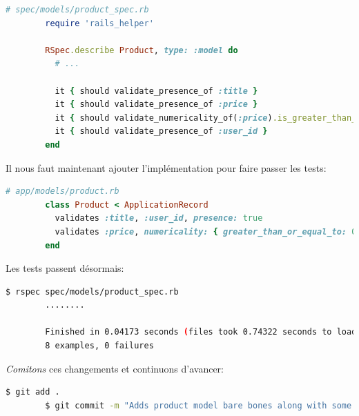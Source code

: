 \documentclass[]{report}
\begin{document}
      \begin{scriptsize}
        \begin{lstlisting}[language=ruby, caption={Ajout de tests de présences pour les produits}, label={lst:add_presence_to_product_test}]
        # spec/models/product_spec.rb
        require 'rails_helper'

        RSpec.describe Product, type: :model do
          # ...

          it { should validate_presence_of :title }
          it { should validate_presence_of :price }
          it { should validate_numericality_of(:price).is_greater_than_or_equal_to(0) }
          it { should validate_presence_of :user_id }
        end
        \end{lstlisting}
      \end{scriptsize}

      Il nous faut maintenant ajouter l'implémentation pour faire passer les tests:

      \begin{scriptsize}
        \begin{lstlisting}[language=ruby]
        # app/models/product.rb
        class Product < ApplicationRecord
          validates :title, :user_id, presence: true
          validates :price, numericality: { greater_than_or_equal_to: 0 }, presence: true
        end
        \end{lstlisting}
      \end{scriptsize}

      Les tests passent désormais:

      \begin{scriptsize}
        \begin{lstlisting}[language=bash]
        $ rspec spec/models/product_spec.rb
        ........

        Finished in 0.04173 seconds (files took 0.74322 seconds to load)
        8 examples, 0 failures
        \end{lstlisting}
      \end{scriptsize}

      \textit{Comitons} ces changements et continuons d'avancer:

      \begin{scriptsize}
        \begin{lstlisting}[language=bash]
        $ git add .
        $ git commit -m "Adds product model bare bones along with some validations"
        \end{lstlisting}
      \end{scriptsize}
\end{document}
